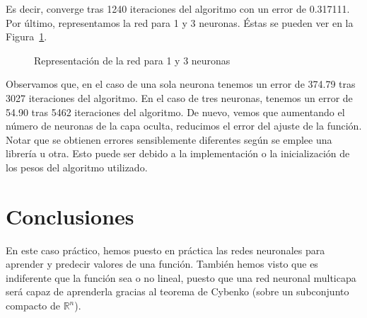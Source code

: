 \documentclass[12pt,a4paper,twoside,openright,titlepage,final]{article}
\begin{document}
Es decir, converge tras 1240 iteraciones del algoritmo con un error de 0.317111.\\

Por último, representamos la red para 1 y 3 neuronas. Éstas se pueden ver en la Figura~\ref{fig:representacion_red}.\\

\begin{figure}[htbp!]
\centering
{}
\caption{Representación de la red para 1 y 3 neuronas} \label{fig:representacion_red}
\end{figure}

Observamos que, en el caso de una sola neurona tenemos un error de 374.79 tras 3027 iteraciones del algoritmo. En el caso de tres neuronas, tenemos un error de 54.90 tras 5462 iteraciones del algoritmo. De nuevo, vemos que aumentando el número de neuronas de la capa oculta, reducimos el error del ajuste de la función. Notar que se obtienen errores sensiblemente diferentes según se emplee una librería u otra. Esto puede ser debido a la implementación o la inicialización de los pesos del algoritmo utilizado.


\section{Conclusiones}

En este caso práctico, hemos puesto en práctica las redes neuronales para aprender y predecir valores de una función. También hemos visto que es indiferente que la función sea o no lineal, puesto que una red neuronal multicapa será capaz de aprenderla gracias al teorema de Cybenko (sobre un subconjunto compacto de $\mathbb{R}^n$).\\
\end{document}
